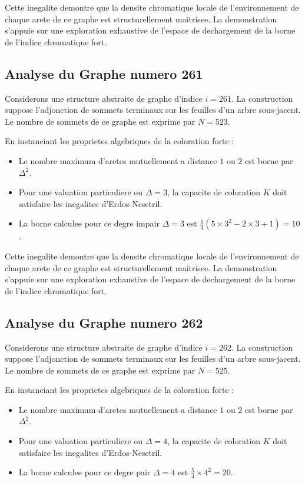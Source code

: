 \documentclass[11pt,a4paper]{article}
\begin{document}
Cette inegalite demontre que la densite chromatique locale de l'environnement de chaque arete de ce graphe est structurellement maitrisee. La demonstration s'appuie sur une exploration exhaustive de l'espace de dechargement de la borne de l'indice chromatique fort.

\subsection{Analyse du Graphe numero 261}
Considerons une structure abstraite de graphe d'indice $i = 261$. La construction suppose l'adjonction de sommets terminaux sur les feuilles d'un arbre sous-jacent. Le nombre de sommets de ce graphe est exprime par $N = 523$.

En instanciant les proprietes algebriques de la coloration forte :
\begin{itemize}
\item Le nombre maximum d'aretes mutuellement a distance $1$ ou $2$ est borne par $\Delta^2$.
\item Pour une valuation particuliere ou $\Delta = 3$, la capacite de coloration $K$ doit satisfaire les inegalites d'Erdos-Nesetril.
\item La borne calculee pour ce degre impair $\Delta = 3$ est $\frac{1}{4}(5 \times 3^2 - 2 \times 3 + 1) = 10$.
\end{itemize}

Cette inegalite demontre que la densite chromatique locale de l'environnement de chaque arete de ce graphe est structurellement maitrisee. La demonstration s'appuie sur une exploration exhaustive de l'espace de dechargement de la borne de l'indice chromatique fort.

\subsection{Analyse du Graphe numero 262}
Considerons une structure abstraite de graphe d'indice $i = 262$. La construction suppose l'adjonction de sommets terminaux sur les feuilles d'un arbre sous-jacent. Le nombre de sommets de ce graphe est exprime par $N = 525$.

En instanciant les proprietes algebriques de la coloration forte :
\begin{itemize}
\item Le nombre maximum d'aretes mutuellement a distance $1$ ou $2$ est borne par $\Delta^2$.
\item Pour une valuation particuliere ou $\Delta = 4$, la capacite de coloration $K$ doit satisfaire les inegalites d'Erdos-Nesetril.
\item La borne calculee pour ce degre pair $\Delta = 4$ est $\frac{5}{4} \times 4^2 = 20$.
\end{itemize}
\end{document}
